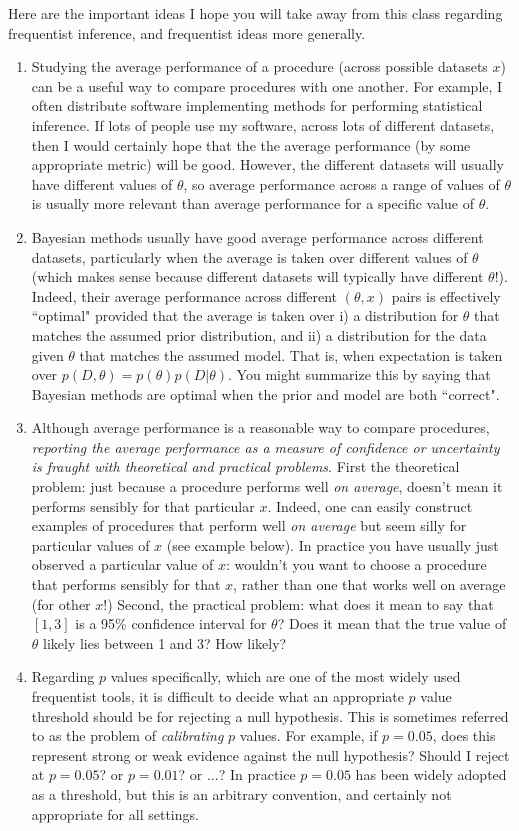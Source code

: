 \documentclass[times,11pt]{article}
\begin{document}
Here are the important ideas I hope you will take away from this class regarding frequentist inference, and frequentist ideas more generally. 
\begin{enumerate}
\item Studying the average performance of a procedure (across possible datasets $x$) can be a useful way to compare procedures with one another. 
For example, I often distribute software implementing methods for performing statistical inference. If lots of people use my software, across lots of different datasets, then 
I would certainly hope that the the average performance (by some appropriate metric) will be good. 
However, the different datasets will usually have different values of $\theta$, so
average performance across a range of values of $\theta$ is usually more relevant than average performance for a specific value of $\theta$.
\item Bayesian methods usually have good average performance across different datasets, particularly when the average
is taken over different values of $\theta$ (which makes sense because different datasets will typically have different $\theta$!). Indeed, their average performance
across different $(\theta, x)$ pairs is effectively ``optimal" provided that the average is taken over
i) a distribution for $\theta$ that matches the assumed prior distribution, and ii) a distribution for the data given $\theta$ that matches the assumed model.
That is, when expectation is taken over $p(D,\theta) = p(\theta) p(D|\theta)$. You might summarize this by saying that Bayesian methods are optimal when
the prior and model are both ``correct".
\item Although average performance is a reasonable way to compare procedures, 
{\it reporting the average performance as a measure of confidence or uncertainty is fraught with theoretical and practical problems}. 
First the theoretical problem: just because
a procedure performs well {\it on average}, doesn't mean it performs sensibly for that particular $x$.  Indeed,  one can easily construct examples of procedures that perform well {\it on average}
but seem silly for particular values of $x$ (see example below).
In practice
you have usually just observed a particular value of $x$: wouldn't you want to choose a procedure that performs sensibly for that $x$, rather than one that works well on average (for other $x$!)
Second, the practical problem: what does it mean to say that $[1,3]$ is a 95\% confidence interval for $\theta$? Does it mean that the true value of $\theta$ likely
lies between 1 and 3? How likely? 
\item Regarding $p$ values specifically, which
are one of the most widely used frequentist tools,
it is difficult to decide what an appropriate $p$ value threshold should be for rejecting a null hypothesis. This is sometimes referred to as the problem of {\it calibrating} $p$ values. For example, if $p=0.05$, does this represent strong or weak evidence against the null hypothesis? Should I reject at $p=0.05$? or $p=0.01$? or ...?
In practice $p=0.05$ has been widely adopted as
a threshold, but this is an arbitrary convention, and certainly not appropriate for all settings.
\end{enumerate}
\end{document}
